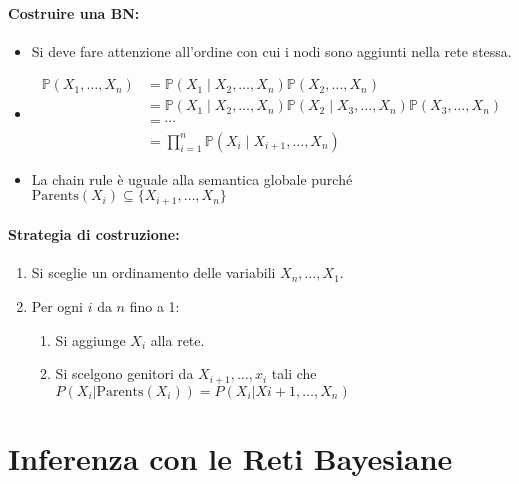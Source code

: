 
\paragraph{Costruire una BN:}

\begin{itemize}
  \item Si deve fare attenzione all'ordine con cui i nodi sono aggiunti nella rete stessa. 
  \item {}
    \begin{align*}
\mathbb{P}(X_1, \ldots, X_n) 
&= \mathbb{P}(X_1 \mid X_2, \ldots, X_n) \mathbb{P}(X_2, \ldots, X_n) \\
&= \mathbb{P}(X_1 \mid X_2, \ldots, X_n) \mathbb{P}(X_2 \mid X_3, \ldots, X_n) \mathbb{P}(X_3, \ldots, X_n) \\
&= \cdots \\
&= \prod_{i=1}^{n} \mathbb{P}(X_i \mid X_{i+1}, \ldots, X_n)
\end{align*}
\item La chain rule è uguale alla semantica globale purché $\text{Parents}(X_i) \subseteq \{X_{i+1},\dots, X_n\}$
\end{itemize}


\paragraph{Strategia di costruzione:}

\begin{enumerate}
  \item Si sceglie un ordinamento delle variabili $X_n, \dots, X_1$.
  \item Per ogni $i$ da $n$ fino a 1:
    \begin{enumerate}
      \item Si aggiunge $X_i$ alla rete. 
      \item Si scelgono genitori da $X_{i+1},\dots, x_i$ tali che $P(X_i|\text{Parents}(X_i)) = P(X_i|X{i+1},\dots, X_n)$
    \end{enumerate}
\end{enumerate}

\section{Inferenza con le Reti Bayesiane}


